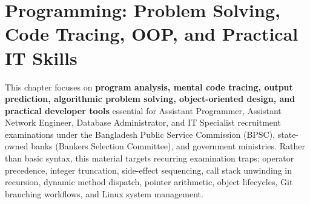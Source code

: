 \chapter{Programming: Problem Solving, Code Tracing, OOP, and Practical IT Skills}
\label{ch:programming_oop_skills}

This chapter focuses on \textbf{program analysis, mental code tracing, output prediction, algorithmic problem solving, object-oriented design, and practical developer tools} essential for Assistant Programmer, Assistant Network Engineer, Database Administrator, and IT Specialist recruitment examinations under the Bangladesh Public Service Commission (BPSC), state-owned banks (Bankers Selection Committee), and government ministries. Rather than basic syntax, this material targets recurring examination traps: operator precedence, integer truncation, side-effect sequencing, call stack unwinding in recursion, dynamic method dispatch, pointer arithmetic, object lifecycles, Git branching workflows, and Linux system management.

